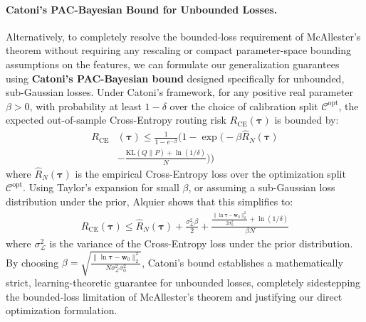 \paragraph{Catoni's PAC-Bayesian Bound for Unbounded Losses.}
Alternatively, to completely resolve the bounded-loss requirement of McAllester's theorem without requiring any rescaling or compact parameter-space bounding assumptions on the features, we can formulate our generalization guarantees using \textbf{Catoni's PAC-Bayesian bound} \cite{catoni2007pac} designed specifically for unbounded, sub-Gaussian losses. Under Catoni's framework, for any positive real parameter $\beta > 0$, with probability at least $1 - \delta$ over the choice of calibration split $\mathcal{C}^{\text{opt}}$, the expected out-of-sample Cross-Entropy routing risk $R_{\text{CE}}(\boldsymbol{\tau})$ is bounded by:
\begin{align}
    R_{\text{CE}}&(\boldsymbol{\tau}) \le \frac{1}{1 - e^{-\beta}} \Big( 1 - \exp\Big( -\beta \hat{R}_N(\boldsymbol{\tau}) \nonumber \\
    &- \frac{\text{KL}(Q \| P) + \ln(1/\delta)}{N} \Big) \Big)
\label{eq:catoni_bound}
\end{align}
where $\hat{R}_N(\boldsymbol{\tau})$ is the empirical Cross-Entropy loss over the optimization split $\mathcal{C}^{\text{opt}}$. Using Taylor's expansion for small $\beta$, or assuming a sub-Gaussian loss distribution under the prior, Alquier \cite{alquier2021user} shows that this simplifies to:
\begin{align}
    R_{\text{CE}}(\boldsymbol{\tau}) \le \hat{R}_N(\boldsymbol{\tau}) + \frac{\sigma_{\mathcal{L}}^2 \beta}{2} + \frac{\frac{\|\ln \boldsymbol{\tau} - \mathbf{w}_0\|_2^2}{2 \sigma_0^2} + \ln(1/\delta)}{\beta N}
\label{eq:catoni_simplified}
\end{align}
where $\sigma_{\mathcal{L}}^2$ is the variance of the Cross-Entropy loss under the prior distribution. By choosing $\beta = \sqrt{\frac{\|\ln \boldsymbol{\tau} - \mathbf{w}_0\|_2^2}{N \sigma_{\mathcal{L}}^2 \sigma_0^2}}$, Catoni's bound establishes a mathematically strict, learning-theoretic guarantee for unbounded losses, completely sidestepping the bounded-loss limitation of McAllester's theorem and justifying our direct optimization formulation.

